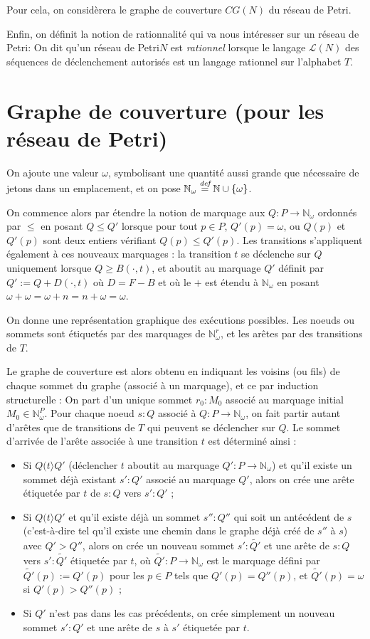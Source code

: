 \documentclass[a4paper,final]{article}
\let\leq\leqslant
\let\geq\geqslant
\newcommand{\os}[1]{\left\{\mathinner{#1}\right\}}
\newcommand{\defeq}{\ensuremath{\stackrel{\textit{def}}{=}}}
\let\union\cup
\newcommand{\N}{\ensuremath{\mathbb{N}}}
\newcommand{\petri}{réseau de Petri\xspace}
\newcommand{\fire}[2]{\ensuremath{#1 (#2\rangle}}
\newcommand{\lang}{\ensuremath{\mathcal{L}}}
\begin{document}
Pour cela, on considèrera le graphe de couverture $CG(N)$ du \petri.

Enfin, on définit la notion de rationnalité qui va nous intéresser sur un \petri :
On dit qu'un \petri $N$ est \emph{rationnel} lorsque le langage $\lang(N)$ des séquences de déclenchement autorisés est un langage rationnel sur l'alphabet $T$.


\section{Graphe de couverture (pour les \petri)}

On ajoute une valeur $\omega$, symbolisant une quantité aussi grande que nécessaire de jetons dans un emplacement, et on pose $\N_\omega\defeq \N\union\os{\omega}$.

On commence alors par étendre la notion de marquage aux $Q:P\to\N_\omega$ ordonnés par $\leq$ en posant $Q\leq Q'$ lorsque pour tout $p\in P$, $Q'(p)=\omega$, ou $Q(p)$ et $Q'(p)$ sont deux entiers vérifiant $Q(p)\leq Q'(p)$.
Les transitions s'appliquent également à ces nouveaux marquages :
la transition $t$ se déclenche sur $Q$ uniquement lorsque $Q\geq B(\cdot,t)$, et aboutit au marquage $Q'$ définit par $Q':=Q+D(\cdot,t)$ où $D=F-B$ et où le $+$ est étendu à $\N_\omega$ en posant $\omega+\omega=\omega+n=n+\omega=\omega$.

On donne une représentation graphique des exécutions possibles.
Les noeuds ou sommets sont étiquetés par des marquages de $\N_\omega^r$, et les arêtes par des transitions de $T$.

Le graphe de couverture est alors obtenu en indiquant les voisins (ou fils) de chaque sommet du graphe (associé à un marquage), et ce par induction structurelle : 
On part d'un unique sommet $r_0:M_0$ associé au marquage initial $M_0\in \N_\omega^P$.
Pour chaque noeud $s:Q$ associé à $Q:P\to\N_\omega$, on fait partir autant d'arêtes que de transitions de $T$ qui peuvent se déclencher sur $Q$.
Le sommet d'arrivée de l'arête associée à une transition $t$ est déterminé ainsi :
\begin{itemize}
    \item Si $\fire{Q}{t}Q'$ (déclencher $t$ aboutit au marquage $Q':P\to\N_\omega$) et qu'il existe un sommet déjà existant $s':Q'$ associé au marquage $Q'$, alors on crée une arête étiquetée par $t$ de $s:Q$ vers $s':Q'$ ;
    \item Si $\fire{Q}{t}Q'$ et qu'il existe déjà un sommet $s'':Q''$ qui soit un antécédent de $s$ (c'est-à-dire tel qu'il existe une chemin dans le graphe déjà créé de $s''$ à $s$) avec $Q'>Q''$, alors on crée un nouveau sommet $s':\widetilde{Q'}$ et une arête de $s:Q$ vers $s':\widetilde{Q'}$ étiquetée par $t$, 
    où $\widetilde{Q'}:P\to\N_\omega$ est le marquage défini par $\widetilde{Q'}(p):=Q'(p)$ pour les $p\in P$ tels que $Q'(p)=Q''(p)$, et $\widetilde{Q'}(p)=\omega$ si $Q'(p)>Q''(p)$ ;
    \item Si $Q'$ n'est pas dans les cas précédents, on crée simplement un nouveau sommet $s':Q'$ et une arête de $s$ à $s'$ étiquetée par $t$.
\end{itemize}
\end{document}
